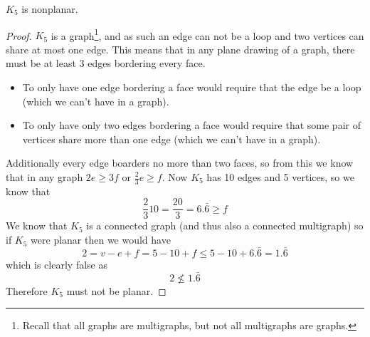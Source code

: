 \documentclass{article}
\begin{document}
\begin{theorem}
	$K_5$ is nonplanar.
\end{theorem}
\begin{center}

	\scalebox{.9}{$K_5$}
\end{center}
\begin{proof}
	$K_5$ is a graph\footnote{Recall that all graphs are multigraphs, but not all multigraphs are graphs.}, and as such an edge can not be a loop and two vertices can share at most one edge. This means that in any plane drawing of a graph, there must be at least 3 edges bordering every face.
	\begin{itemize}
		\item To only have one edge bordering a face would require that the edge be a loop (which we can't have in a graph).
		\item To only have only two edges bordering a face would require that some pair of vertices share more than one edge (which we can't have in a graph).
	\end{itemize}
	Additionally every edge boarders no more than two faces, so from this we know that in any graph $2e \ge 3f$ or $\frac23e\ge f$. Now $K_5$ has 10 edges and 5 vertices, so we know that $$\frac2310=\frac{20}3=6.\bar6\ge f$$ We know that $K_5$ is a connected graph (and thus also a connected multigraph) so if $K_5$ were planar then we would have $$2=v-e+f=5-10+f\le5-10+6.\bar6 = 1.\bar6$$ which is clearly false as $$2\not\le1.\bar6$$ Therefore $K_5$ must not be planar.
\end{proof}
\end{document}
